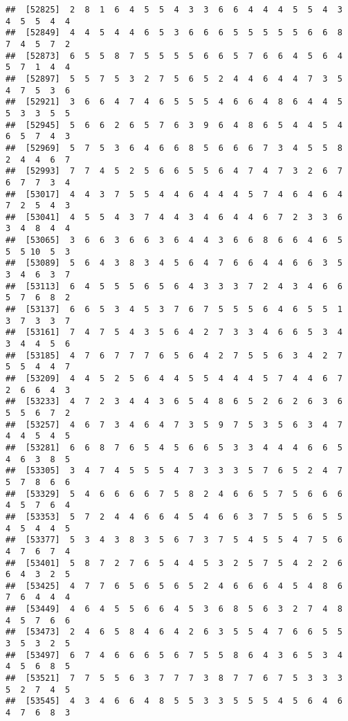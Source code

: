 \documentclass[
]{book}
\begin{document}
\begin{verbatim}
##  [52825]  2  8  1  6  4  5  5  4  3  3  6  6  4  4  4  5  5  4  3  4  5  5  4  4
##  [52849]  4  4  5  4  4  6  5  3  6  6  6  5  5  5  5  5  6  6  8  7  4  5  7  2
##  [52873]  6  5  5  8  7  5  5  5  5  6  6  5  7  6  6  4  5  6  4  5  7  1  4  4
##  [52897]  5  5  7  5  3  2  7  5  6  5  2  4  4  6  4  4  7  3  5  4  7  5  3  6
##  [52921]  3  6  6  4  7  4  6  5  5  5  4  6  6  4  8  6  4  4  5  5  3  3  5  5
##  [52945]  5  6  6  2  6  5  7  6  3  9  6  4  8  6  5  4  4  5  4  6  5  7  4  3
##  [52969]  5  7  5  3  6  4  6  6  8  5  6  6  6  7  3  4  5  5  8  2  4  4  6  7
##  [52993]  7  7  4  5  2  5  6  6  5  5  6  4  7  4  7  3  2  6  7  6  7  7  3  4
##  [53017]  4  4  3  7  5  5  4  4  6  4  4  4  5  7  4  6  4  6  4  7  2  5  4  3
##  [53041]  4  5  5  4  3  7  4  4  3  4  6  4  4  6  7  2  3  3  6  3  4  8  4  4
##  [53065]  3  6  6  3  6  6  3  6  4  4  3  6  6  8  6  6  4  6  5  5  5 10  5  3
##  [53089]  5  6  4  3  8  3  4  5  6  4  7  6  6  4  4  6  6  3  5  3  4  6  3  7
##  [53113]  6  4  5  5  5  6  5  6  4  3  3  3  7  2  4  3  4  6  6  5  7  6  8  2
##  [53137]  6  6  5  3  4  5  3  7  6  7  5  5  5  6  4  6  5  5  1  3  7  3  3  7
##  [53161]  7  4  7  5  4  3  5  6  4  2  7  3  3  4  6  6  5  3  4  3  4  4  5  6
##  [53185]  4  7  6  7  7  7  6  5  6  4  2  7  5  5  6  3  4  2  7  5  5  4  4  7
##  [53209]  4  4  5  2  5  6  4  4  5  5  4  4  4  5  7  4  4  6  7  2  6  6  4  3
##  [53233]  4  7  2  3  4  4  3  6  5  4  8  6  5  2  6  2  6  3  6  5  5  6  7  2
##  [53257]  4  6  7  3  4  6  4  7  3  5  9  7  5  3  5  6  3  4  7  4  4  5  4  5
##  [53281]  6  6  8  7  6  5  4  5  6  6  5  3  3  4  4  4  6  6  5  4  6  3  8  5
##  [53305]  3  4  7  4  5  5  5  4  7  3  3  3  5  7  6  5  2  4  7  5  7  8  6  6
##  [53329]  5  4  6  6  6  6  7  5  8  2  4  6  6  5  7  5  6  6  6  4  5  7  6  4
##  [53353]  5  7  2  4  4  6  6  4  5  4  6  6  3  7  5  5  6  5  5  4  5  4  4  5
##  [53377]  5  3  4  3  8  3  5  6  7  3  7  5  4  5  5  4  7  5  6  4  7  6  7  4
##  [53401]  5  8  7  2  7  6  5  4  4  5  3  2  5  7  5  4  2  2  6  6  4  3  2  5
##  [53425]  4  7  7  6  5  6  5  6  5  2  4  6  6  6  4  5  4  8  6  7  6  4  4  4
##  [53449]  4  6  4  5  5  6  6  4  5  3  6  8  5  6  3  2  7  4  8  4  5  7  6  6
##  [53473]  2  4  6  5  8  4  6  4  2  6  3  5  5  4  7  6  6  5  5  3  5  3  2  5
##  [53497]  6  7  4  6  6  6  5  6  7  5  5  8  6  4  3  6  5  3  4  4  5  6  8  5
##  [53521]  7  7  5  5  6  3  7  7  7  3  8  7  7  6  7  5  3  3  3  5  2  7  4  5
##  [53545]  4  3  4  6  6  4  8  5  5  3  3  5  5  5  4  5  6  4  6  4  7  6  8  3

\end{verbatim}
\end{document}
